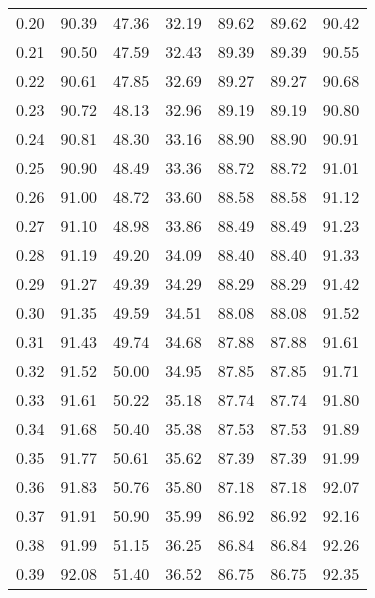 \begin{tabular}{|c|c|c|c|c|c|c|}
      0.20 &     90.39 &     47.36 &      32.19 &   89.62 &      89.62 &         90.42 \\
      0.21 &     90.50 &     47.59 &      32.43 &   89.39 &      89.39 &         90.55 \\
      0.22 &     90.61 &     47.85 &      32.69 &   89.27 &      89.27 &         90.68 \\
      0.23 &     90.72 &     48.13 &      32.96 &   89.19 &      89.19 &         90.80 \\
      0.24 &     90.81 &     48.30 &      33.16 &   88.90 &      88.90 &         90.91 \\
      0.25 &     90.90 &     48.49 &      33.36 &   88.72 &      88.72 &         91.01 \\
      0.26 &     91.00 &     48.72 &      33.60 &   88.58 &      88.58 &         91.12 \\
      0.27 &     91.10 &     48.98 &      33.86 &   88.49 &      88.49 &         91.23 \\
      0.28 &     91.19 &     49.20 &      34.09 &   88.40 &      88.40 &         91.33 \\
      0.29 &     91.27 &     49.39 &      34.29 &   88.29 &      88.29 &         91.42 \\
      0.30 &     91.35 &     49.59 &      34.51 &   88.08 &      88.08 &         91.52 \\
      0.31 &     91.43 &     49.74 &      34.68 &   87.88 &      87.88 &         91.61 \\
      0.32 &     91.52 &     50.00 &      34.95 &   87.85 &      87.85 &         91.71 \\
      0.33 &     91.61 &     50.22 &      35.18 &   87.74 &      87.74 &         91.80 \\
      0.34 &     91.68 &     50.40 &      35.38 &   87.53 &      87.53 &         91.89 \\
      0.35 &     91.77 &     50.61 &      35.62 &   87.39 &      87.39 &         91.99 \\
      0.36 &     91.83 &     50.76 &      35.80 &   87.18 &      87.18 &         92.07 \\
      0.37 &     91.91 &     50.90 &      35.99 &   86.92 &      86.92 &         92.16 \\
      0.38 &     91.99 &     51.15 &      36.25 &   86.84 &      86.84 &         92.26 \\
      0.39 &     92.08 &     51.40 &      36.52 &   86.75 &      86.75 &         92.35 \\

\end{tabular}
